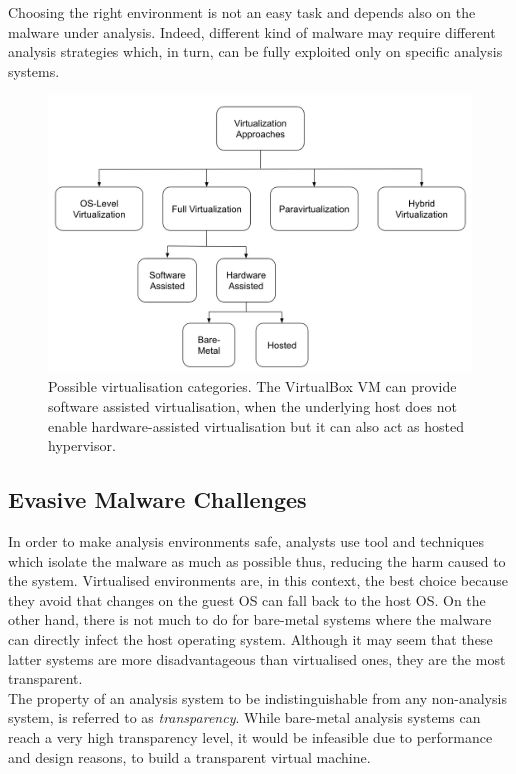 \documentclass[LaM,binding=0.6cm]{sapthesis}
\begin{document}
Choosing the right environment is not an easy task and depends also on the malware under analysis. Indeed, different kind of malware may require different analysis strategies which, in turn, can be fully exploited only on specific analysis systems.
\begin{figure}[h!]
\centering
\includegraphics[scale=.5]{images/background4}
\caption{Possible virtualisation categories. The VirtualBox VM can provide software assisted virtualisation, when the underlying host does not enable hardware-assisted virtualisation but it can also act as hosted hypervisor.}
\end{figure}
\newpage
\subsection{Evasive Malware Challenges}
\label{subsec:evasivemalware}
In order to make analysis environments safe, analysts use tool and techniques which isolate the malware as much as possible thus, reducing the harm caused to the system. Virtualised environments are, in this context, the best choice because they avoid that changes on the guest OS can fall back to the host OS. On the other hand, there is not much to do for bare-metal systems where the malware can directly infect the host operating system. Although it may seem that these latter systems are more disadvantageous than virtualised ones, they are the most transparent.\\
The property of an analysis system to be indistinguishable from any non-analysis system, is referred to as \textit{transparency}\cite{bulazel2017survey}. While bare-metal analysis systems can reach a very high transparency level, it would be infeasible due to performance and design reasons, to build a transparent virtual machine\cite{garfinkel2007compatibility}.\\
\end{document}
